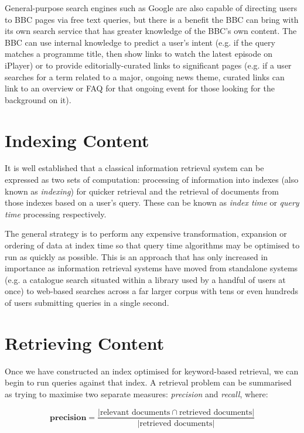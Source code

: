 General-purpose search engines such as Google are also capable of directing
users to BBC pages via free text queries, but there is a benefit the BBC
can bring with its own search service that has greater knowledge of the
BBC's own content. The BBC can use internal knowledge to predict a user's
intent (e.g. if the query matches a programme title, then show links to watch
the latest episode on iPlayer) or to provide editorially-curated
links to significant pages (e.g. if a user searches for a term
related to a major, ongoing news theme, curated links can
link to an overview or FAQ for that ongoing event for those
looking for the background on it).

\section{Indexing Content}

It is well established that a classical information retrieval system
can be expressed as two sets of computation: processing of information
into indexes (also known as \emph{indexing}) for quicker retrieval
and the retrieval of documents from those indexes based on a user's
query. These can be known as \emph{index time} or \emph{query time}
processing respectively.

The general strategy is to perform
any expensive transformation, expansion or ordering of data
at index time so that query time algorithms may be optimised to
run as quickly as possible. This is an approach that has only
increased in importance as information retrieval systems have moved
from standalone systems (e.g. a catalogue search situated within
a library used by a handful of users at once) to web-based
searches across a far larger corpus with tens or even hundreds of
users submitting queries in a single second.

\section{Retrieving Content}

Once we have constructed an index optimised for keyword-based retrieval,
we can begin to run queries against that index. A retrieval problem
can be summarised as trying to maximise two separate measures: \emph{precision}
and \emph{recall}, where:

\begin{displaymath}
  \textbf{precision} = \frac{
    |\text{relevant documents} \cap \text{retrieved documents}|
  }{
    |\text{retrieved documents}|
  }
\end{displaymath}

